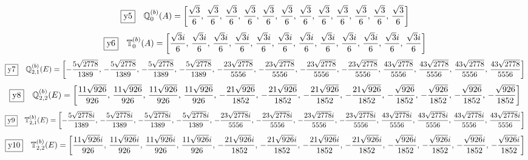\documentclass[fleqn,10pt,landscape]{jsarticle}
\begin{document}
\begin{dmath*}
\fbox{y5}\quad \mathbb{Q}_{0}^{(b)}(A)=\left[ \frac{\sqrt{3}}{6},\, \frac{\sqrt{3}}{6},\, \frac{\sqrt{3}}{6},\, \frac{\sqrt{3}}{6},\, \frac{\sqrt{3}}{6},\, \frac{\sqrt{3}}{6},\, \frac{\sqrt{3}}{6},\, \frac{\sqrt{3}}{6},\, \frac{\sqrt{3}}{6},\, \frac{\sqrt{3}}{6},\, \frac{\sqrt{3}}{6},\, \frac{\sqrt{3}}{6} \right]
\end{dmath*}
\begin{dmath*}
\fbox{y6}\quad \mathbb{T}_{0}^{(b)}(A)=\left[ \frac{\sqrt{3} i}{6},\, \frac{\sqrt{3} i}{6},\, \frac{\sqrt{3} i}{6},\, \frac{\sqrt{3} i}{6},\, \frac{\sqrt{3} i}{6},\, \frac{\sqrt{3} i}{6},\, \frac{\sqrt{3} i}{6},\, \frac{\sqrt{3} i}{6},\, \frac{\sqrt{3} i}{6},\, \frac{\sqrt{3} i}{6},\, \frac{\sqrt{3} i}{6},\, \frac{\sqrt{3} i}{6} \right]
\end{dmath*}
\begin{dmath*}
\fbox{y7}\quad \mathbb{Q}_{2,1}^{(b)}(E)=\left[ - \frac{5 \sqrt{2778}}{1389},\, - \frac{5 \sqrt{2778}}{1389},\, - \frac{5 \sqrt{2778}}{1389},\, - \frac{5 \sqrt{2778}}{1389},\, - \frac{23 \sqrt{2778}}{5556},\, - \frac{23 \sqrt{2778}}{5556},\, - \frac{23 \sqrt{2778}}{5556},\, - \frac{23 \sqrt{2778}}{5556},\, \frac{43 \sqrt{2778}}{5556},\, \frac{43 \sqrt{2778}}{5556},\, \frac{43 \sqrt{2778}}{5556},\, \frac{43 \sqrt{2778}}{5556} \right]
\end{dmath*}
\begin{dmath*}
\fbox{y8}\quad \mathbb{Q}_{2,2}^{(b)}(E)=\left[ \frac{11 \sqrt{926}}{926},\, \frac{11 \sqrt{926}}{926},\, \frac{11 \sqrt{926}}{926},\, \frac{11 \sqrt{926}}{926},\, - \frac{21 \sqrt{926}}{1852},\, - \frac{21 \sqrt{926}}{1852},\, - \frac{21 \sqrt{926}}{1852},\, - \frac{21 \sqrt{926}}{1852},\, - \frac{\sqrt{926}}{1852},\, - \frac{\sqrt{926}}{1852},\, - \frac{\sqrt{926}}{1852},\, - \frac{\sqrt{926}}{1852} \right]
\end{dmath*}
\begin{dmath*}
\fbox{y9}\quad \mathbb{T}_{2,1}^{(b)}(E)=\left[ - \frac{5 \sqrt{2778} i}{1389},\, - \frac{5 \sqrt{2778} i}{1389},\, - \frac{5 \sqrt{2778} i}{1389},\, - \frac{5 \sqrt{2778} i}{1389},\, - \frac{23 \sqrt{2778} i}{5556},\, - \frac{23 \sqrt{2778} i}{5556},\, - \frac{23 \sqrt{2778} i}{5556},\, - \frac{23 \sqrt{2778} i}{5556},\, \frac{43 \sqrt{2778} i}{5556},\, \frac{43 \sqrt{2778} i}{5556},\, \frac{43 \sqrt{2778} i}{5556},\, \frac{43 \sqrt{2778} i}{5556} \right]
\end{dmath*}
\begin{dmath*}
\fbox{y10}\quad \mathbb{T}_{2,2}^{(b)}(E)=\left[ \frac{11 \sqrt{926} i}{926},\, \frac{11 \sqrt{926} i}{926},\, \frac{11 \sqrt{926} i}{926},\, \frac{11 \sqrt{926} i}{926},\, - \frac{21 \sqrt{926} i}{1852},\, - \frac{21 \sqrt{926} i}{1852},\, - \frac{21 \sqrt{926} i}{1852},\, - \frac{21 \sqrt{926} i}{1852},\, - \frac{\sqrt{926} i}{1852},\, - \frac{\sqrt{926} i}{1852},\, - \frac{\sqrt{926} i}{1852},\, - \frac{\sqrt{926} i}{1852} \right]
\end{dmath*}
\end{document}
